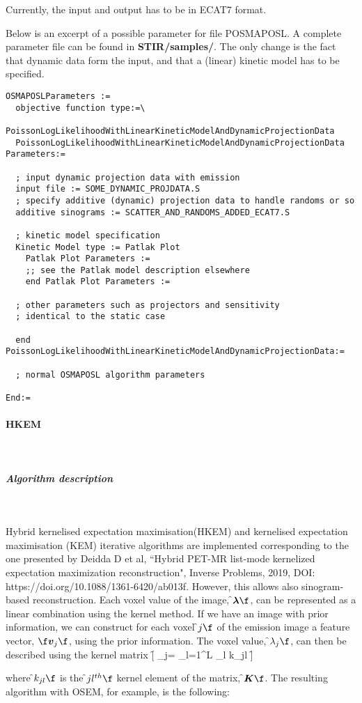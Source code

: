 \documentclass{article}
\newcommand{\subsubsubsection}[1]{\paragraph{#1}\mbox{} \\}
\newcommand{\subsubsubsubsection}[1]{\subparagraph{#1} \mbox{} \\}
\begin{document}
{Currently, the input and output has to be in ECAT7 format. 

Below is an excerpt of a possible parameter for file POSMAPOSL. A complete parameter file
can be found in \textbf{STIR/samples/}. The only change is the fact that dynamic data
form the input, and that a (linear) kinetic model has to be specified.

\begin{verbatim}
OSMAPOSLParameters :=
  objective function type:=\
     PoissonLogLikelihoodWithLinearKineticModelAndDynamicProjectionData
  PoissonLogLikelihoodWithLinearKineticModelAndDynamicProjectionData Parameters:=

  ; input dynamic projection data with emission
  input file := SOME_DYNAMIC_PROJDATA.S
  ; specify additive (dynamic) projection data to handle randoms or so
  additive sinograms := SCATTER_AND_RANDOMS_ADDED_ECAT7.S

  ; kinetic model specification
  Kinetic Model type := Patlak Plot
    Patlak Plot Parameters :=
    ;; see the Patlak model description elsewhere
    end Patlak Plot Parameters :=

  ; other parameters such as projectors and sensitivity 
  ; identical to the static case

  end PoissonLogLikelihoodWithLinearKineticModelAndDynamicProjectionData:=

  ; normal OSMAPOSL algorithm parameters 

End:=
\end{verbatim}

{ \subsubsubsection{HKEM}
}
\label{sec:HKEM}
  { \subsubsubsubsection{Algorithm description}
  }
  Hybrid kernelised expectation maximisation(HKEM) and kernelised expectation maximisation (KEM) iterative algorithms
  are implemented corresponding to the one presented by Deidda D et al, ``Hybrid PET-MR list-mode kernelized expectation maximization reconstruction",
  Inverse Problems, 2019, DOI: https://doi.org/10.1088/1361-6420/ab013f. However, this allows
  also sinogram-based reconstruction. Each voxel value of the image, \f$ \boldsymbol{\lambda}\f$, can be represented as a
  linear combination using the kernel method.  If we have an image with prior information, we can construct for each voxel
  \f$ j \f$ of the emission image a feature vector, $\f \boldsymbol{v}_j \f$, using the prior information. The voxel value,
  \f$\lambda_j\f$, can then be described using the kernel matrix 
  \f[
   \lambda_j=  \sum_{l=1}^L \alpha_l k_{jl}
  \f]

  where \f$k_{jl}\f$ is the \f$jl^{th}\f$ kernel element of the matrix, \f$\boldsymbol{K}\f$.
  The resulting algorithm with OSEM, for example, is the following:

}
\end{document}
